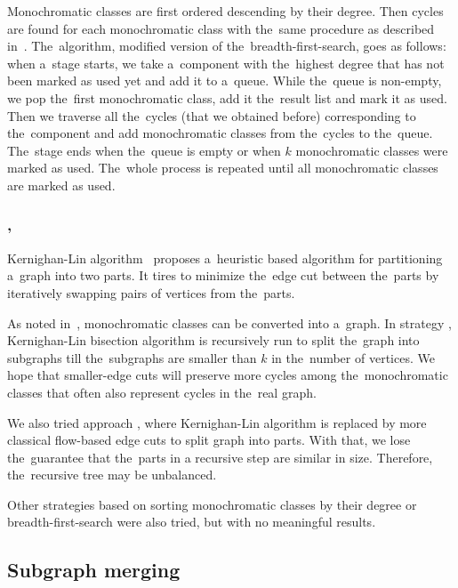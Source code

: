 Monochromatic classes are first ordered descending by their degree.
Then cycles are found for each monochromatic class with the~same procedure
as described in~.
The~algorithm, modified version of the~breadth-first-search, goes as follows:
when a~stage starts, we take a~component with the~highest degree
that has not been marked as used yet and add it to a~queue.
While the~queue is non-empty, we pop the~first monochromatic class,
add it the~result list and mark it as used.
Then we traverse all the~cycles (that we obtained before)
corresponding to the~component
and add monochromatic classes from the~cycles to the~queue.
The~stage ends when the~queue is empty or when \( k \) monochromatic classes
were marked as used. The~whole process is repeated until
all monochromatic classes are marked as used.

\subsubsection*{\KernighanLin{}, \Cuts{}}

Kernighan-Lin algorithm~\cite{kernighan_lin} proposes a~heuristic based algorithm
for partitioning a~graph into two parts. It tires to minimize the~edge cut between
the~parts by iteratively swapping pairs of vertices from the~parts.

As noted in~,
monochromatic classes can be converted into a~graph.
In strategy \KernighanLin{},
Kernighan-Lin bisection algorithm is recursively run to split the~graph
into subgraphs till the~subgraphs are smaller than \( k \) in the~number of vertices.
We hope that smaller-edge cuts will preserve more cycles among
the~monochromatic classes that often also represent cycles in the~real graph.

We also tried approach \Cuts{}, where Kernighan-Lin algorithm is replaced by
more classical flow-based edge cuts to split graph into parts.
With that, we lose the~guarantee that the~parts in a recursive step
are similar in size. Therefore, the~recursive tree may be unbalanced.

Other strategies based on
sorting monochromatic classes by their degree
or breadth-first-search were also tried,
but with no meaningful results.



\subsection{Subgraph merging}%
\label{sec:merging}

